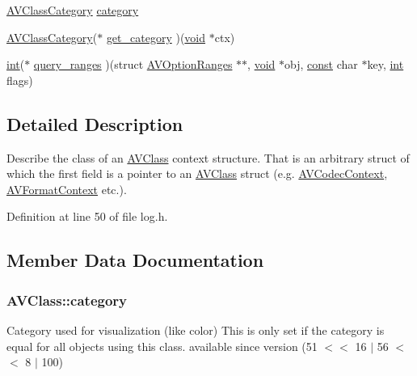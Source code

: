 \begin{DoxyCompactItemize}
\item 
\hyperlink{ffmpeg_2libavutil_2log_8h_aeb1c06cc3e47a029ca6afeac782ac8f9}{A\+V\+Class\+Category} \hyperlink{struct_a_v_class_a5fc161d93a0d65a608819da20b7203ba}{category}
\item 
\hyperlink{ffmpeg_2libavutil_2log_8h_aeb1c06cc3e47a029ca6afeac782ac8f9}{A\+V\+Class\+Category}($\ast$ \hyperlink{struct_a_v_class_a511382185d3206043d5d37c1007f199c}{get\+\_\+category} )(\hyperlink{sound_8c_ae35f5844602719cf66324f4de2a658b3}{void} $\ast$ctx)
\item 
\hyperlink{xmltok_8h_a5a0d4a5641ce434f1d23533f2b2e6653}{int}($\ast$ \hyperlink{struct_a_v_class_a1f25d6b76f5a8b474cc1cb16aa5ed5df}{query\+\_\+ranges} )(struct \hyperlink{struct_a_v_option_ranges}{A\+V\+Option\+Ranges} $\ast$$\ast$, \hyperlink{sound_8c_ae35f5844602719cf66324f4de2a658b3}{void} $\ast$obj, \hyperlink{getopt1_8c_a2c212835823e3c54a8ab6d95c652660e}{const} char $\ast$key, \hyperlink{xmltok_8h_a5a0d4a5641ce434f1d23533f2b2e6653}{int} flags)
\end{DoxyCompactItemize}


\subsection{Detailed Description}
Describe the class of an \hyperlink{struct_a_v_class}{A\+V\+Class} context structure. That is an arbitrary struct of which the first field is a pointer to an \hyperlink{struct_a_v_class}{A\+V\+Class} struct (e.\+g. \hyperlink{struct_a_v_codec_context}{A\+V\+Codec\+Context}, \hyperlink{struct_a_v_format_context}{A\+V\+Format\+Context} etc.). 

Definition at line 50 of file log.\+h.



\subsection{Member Data Documentation}
\subsubsection[{\texorpdfstring{category}{category}}]{ A\+V\+Class\+::category}\hypertarget{struct_a_v_class_a5fc161d93a0d65a608819da20b7203ba}{}\label{struct_a_v_class_a5fc161d93a0d65a608819da20b7203ba}
Category used for visualization (like color) This is only set if the category is equal for all objects using this class. available since version (51 $<$$<$ 16 $\vert$ 56 $<$$<$ 8 $\vert$ 100) 

